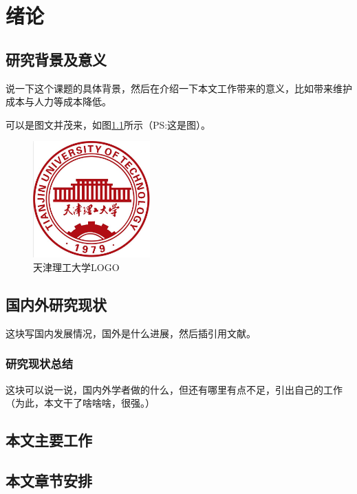 

\chapter{绪论}
\section{研究背景及意义}

说一下这个课题的具体背景，然后在介绍一下本文工作带来的意义，比如带来维护成本与人力等成本降低。

可以是图文并茂来，如图\ref{LOGO}所示（PS:这是图）。

\begin{figure}[!htbp]
  \centering
  \includegraphics[width=0.4\textwidth]{figures/TUT_LOGO.jpg}
  \caption{\hspace{-1em}天津理工大学LOGO}
  \label{LOGO}
\end{figure}


\section{国内外研究现状}

这块写国内发展情况，国外是什么进展，然后插引用文献。

\subsection{研究现状总结}

这块可以说一说，国内外学者做的什么，但还有哪里有点不足，引出自己的工作（为此，本文干了啥啥啥，很强。）



\section{本文主要工作}



\section{本文章节安排}


